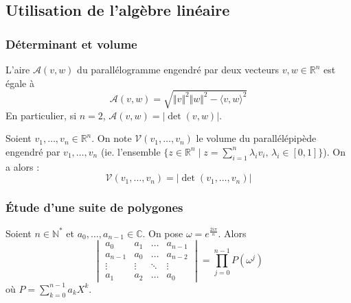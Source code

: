   \subsection{Utilisation de l'algèbre linéaire}

  \subsubsection{Déterminant et volume}


  \begin{theorem}
    L'aire $\mathcal{A}(v,w)$ du parallélogramme engendré par deux vecteurs $v, w \in \mathbb{R}^n$ est égale à
    \[ \mathcal{A}(v,w) = \sqrt{\Vert v \Vert^2\Vert w \Vert^2 - \langle v,w \rangle^2} \]
    En particulier, si $n=2$, $\mathcal{A}(v,w)=\vert\det(v,w)\vert$.
  \end{theorem}

  \begin{corollary}
    Soient $v_1, \dots, v_n \in \mathbb{R}^n$. On note $\mathcal{V}(v_1, \dots, v_n)$ le volume du parallélépipède engendré par $v_1, \dots, v_n$ (ie. l'ensemble $\{ z \in \mathbb{R}^n \mid z = \sum_{i=1}^n \lambda_i v_i, \, \lambda_i \in [0,1] \}$). On a alors :
    \[ \mathcal{V}(v_1, \dots, v_n) = \vert \det(v_1, \dots, v_n) \vert \]
  \end{corollary}

  \subsubsection{Étude d'une suite de polygones}


  \begin{proposition}
    Soient $n \in \mathbb{N}^*$ et $a_0, \dots, a_{n-1} \in \mathbb{C}$. On pose $\omega = e^{\frac{2i\pi}{n}}$. Alors
    \[ \begin{vmatrix} a_0 & a_1 & \dots & a_{n-1} \\ a_{n-1} & a_0 & \dots & a_{n-2}\\ \vdots & \vdots & \ddots & \vdots \\ a_1 & a_2 & \dots & a_0 \end{vmatrix} = \prod_{j=0}^{n-1} P(\omega^j) \]
    où $P = \sum_{k=0}^{n-1} a_k X^k$.
  \end{proposition}



